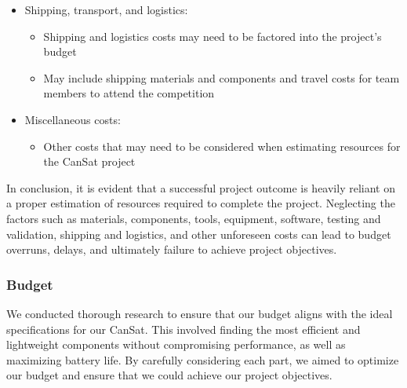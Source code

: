 \documentclass[11pt]{article}
\begin{document}
\begin{itemize}[leftmargin=1cm, itemindent=0.25cm, noitemsep, topsep=0pt, label=$\bullet$]
\begin{itemize}[label=, noitemsep, topsep=1pt]
\end{itemize}
\item Shipping, transport, and logistics:
\begin{itemize}[label=, noitemsep, topsep=1pt]
\item Shipping and logistics costs may need to be factored into the project’s budget
\item May include shipping materials and components and travel costs for team members to attend the competition
\end{itemize}
\item Miscellaneous costs:
\begin{itemize}[label=, noitemsep, topsep=1pt]
\item Other costs that may need to be considered when estimating resources for the CanSat project
\end{itemize}
\end{itemize}

In conclusion, it is evident that a successful project outcome is heavily reliant on a proper estimation of resources required to complete the project. Neglecting the factors such as materials, components, tools, equipment, software, testing and validation, shipping and logistics, and other unforeseen costs can lead to budget overruns, delays, and ultimately failure to achieve project objectives.

\subsubsection{Budget}

We conducted thorough research to ensure that our budget aligns with the ideal specifications for our CanSat. This involved finding the most efficient and lightweight components without compromising performance, as well as maximizing battery life. By carefully considering each part, we aimed to optimize our budget and ensure that we could achieve our project objectives.
\end{document}
